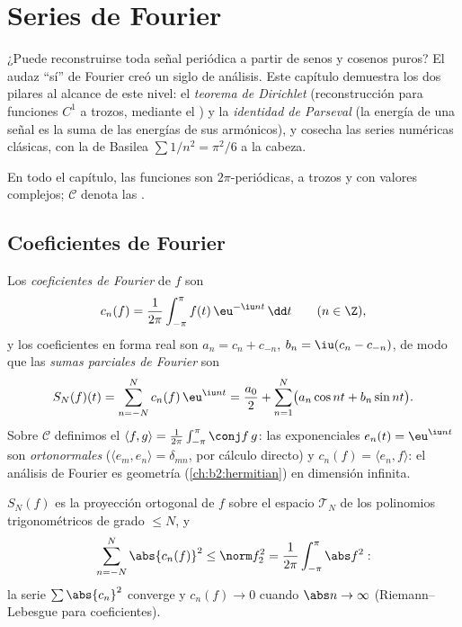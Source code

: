 \chapter{Series de Fourier}\label{ch:b2:fourier}

¿Puede reconstruirse toda señal periódica a partir de senos y cosenos
puros? El audaz ``sí'' de Fourier creó un siglo de análisis. Este
capítulo demuestra los dos pilares al alcance de este nivel: el
\emph{teorema de Dirichlet} (reconstrucción  para funciones $C^1$
a trozos, mediante el ) y la \emph{identidad de
Parseval} (la energía de una señal es la suma de las energías de sus
armónicos), y cosecha las series numéricas clásicas, con la de Basilea
$\sum 1/n^2 = \pi^2/6$ a la cabeza.

En todo el capítulo, las funciones son $2\pi$-periódicas,  a
trozos y con valores complejos; $\mathcal{C}$ denota las .

\section{Coeficientes de Fourier}

\begin{definition}\label{def:b2:fourier:coefficients}
Los \emph{coeficientes de Fourier} de
$f$ son
\[
c_n(f) = \frac{1}{2\pi}\int_{-\pi}^{\pi} f(t)\,\eu^{-\iu n t}\,\dd
t \qquad (n \in \Z),
\]
y los coeficientes en forma real son $a_n = c_n + c_{-n}$, $b_n =
\iu(c_n - c_{-n})$, de modo que las \emph{sumas parciales de
Fourier} son
\[
S_N(f)(t) = \sum_{n=-N}^{N} c_n(f)\,\eu^{\iu nt}
= \frac{a_0}{2} + \sum_{n=1}^{N}\bigl(a_n\cos nt + b_n \sin
nt\bigr).
\]
Sobre $\mathcal{C}$ definimos el  $\langle
f, g\rangle = \frac{1}{2\pi}\int_{-\pi}^{\pi}\conj f\,g$: las
exponenciales $e_n(t) = \eu^{\iu nt}$ son \emph{ortonormales}
($\langle e_m, e_n\rangle = \delta_{mn}$, por cálculo directo) y
$c_n(f) = \langle e_n, f\rangle$: el análisis de Fourier es geometría
 (\cref{ch:b2:hermitian}) en dimensión infinita.
\end{definition}

\begin{proposition}\label{prop:b2:fourier:bessel}
$S_N(f)$ es la proyección ortogonal de $f$ sobre el espacio
$\mathcal{T}_N$ de los polinomios trigonométricos de grado $\leq N$,
y
\[
\sum_{n=-N}^{N} \abs{c_n(f)}^2 \leq \norm f_2^2 =
\frac{1}{2\pi}\int_{-\pi}^{\pi} \abs f^2 :
\]
la serie $\sum \abs{c_n}^2$ converge y $c_n(f) \to 0$ cuando $\abs n
\to \infty$ (Riemann--Lebesgue para coeficientes).
\end{proposition}

